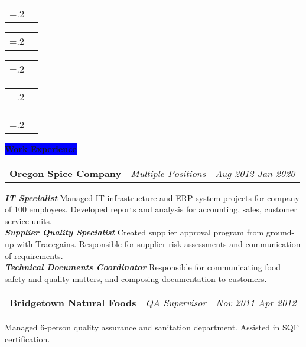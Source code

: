 \documentclass[letterpaper,12pt]{article}[leftmargin=*]
\newcommand{\experience}[2]{\vspace{6pt}
  \colorbox{Blue}{\color{white}#1\hspace{9pt}\raggedbottom\normalsize\textbf{#2\hspace{4pt}}}
}
\newcommand{\resumeSectionStart}{\begin{itemize}[leftmargin=0.1in]}
\newcommand{\resumeSectionEnd}{\end{itemize}}
\newcommand{\resumeSkill}[2]{
  \vspace{-3pt}
  \item[]
    \begin{tabularx}{0.97\textwidth}{>{\hsize=.2\hsize}X X }
      {\textbf{#1}} & {\small#2} \\
    \end{tabularx}
  \vspace{-3pt}
}
\newcommand{\resumeExperience}[3]{
  \vspace{-3pt}
  \item[]
    \begin{tabularx}{0.97\textwidth}{>{\raggedright}X >{\raggedright\arraybackslash}X >{\raggedleft\arraybackslash}X}
      \textbf{\color{primary}#1} & \textit{\color{accent}#2} & \textit{\color{accent}\small#3} \\
    \end{tabularx}
}
\newcommand{\tag}[1]{%
  \tikzmarknode[fill=white,fill
opacity=0,draw=subtle!60!subtle,thick,rounded corners,inner sep=0.4ex,text height=1.5ex,text depth=.25ex, text opacity=1]{test}{\hspace{1pt}\small{#1}\hspace{1pt}}
}
\begin{document}
\resumeSectionStart{

  \resumeSkill{Food Science}{
    \tag{Supplier Risk Assessment}
    \tag{Food Fraud Controls}
    \tag{Analytical Chemistry}
    \tag{Microbiology}
    \tag{Technical Documentation}
    \tag{HACCP/HARPC}
    \tag{BRC Certification}
    \tag{SQF Lvl 2 Certification}
  }

  \resumeSkill{Data Analysis}{
    \tag{ETL \& Data Cleaning}
    \tag{Natural Language Processing}
    \tag{Report Design}
    \tag{Database Design}
    \tag{Web Scraping}
    \tag{Technical Writing}
  }

  \resumeSkill{Python}{
    \tag{Pandas}
    \tag{NumPy}
    \tag{SciPy}
    \tag{SciKit-Learn}
    \tag{Conda}
    \tag{NLTK}
    \tag{spaCy}
    \tag{Matplotlib}
    \tag{Seaborn}
  }

  \resumeSkill{Languages}{
    \tag{SQL}
    \tag{Regex}
    \tag{HTML/CSS/Javascript}
    \tag{Visual Basic}
    \tag{C/C++}
    \tag{Latex}
  }

  \resumeSkill{Tools}{
    \tag{PostgreSQL}
    \tag{SQL Server}
    \tag{SQLite}
    \tag{Git \& GitHub}
    \tag{Excel}
    \tag{JIRA}
    \tag{Linux Admin}
    \tag{Database Admin}
    \tag{Windows Server Admin}
  }

}
\resumeSectionEnd{}

\experience{\faPieChart}{Work Experience}

\resumeSectionStart{
  \resumeExperience{Oregon Spice Company}{Multiple Positions}{Aug 2012 \textemdash{} Jan 2020}
  \textbf{\textit{\color{accent}IT Specialist}} \textemdash{} Managed IT infrastructure and ERP system projects for company of 100 employees. Developed reports and analysis for accounting, sales, customer service units. \\
  \textbf{\textit{\color{accent}Supplier Quality Specialist}} \textemdash{} Created supplier approval program from ground-up with Tracegains. Responsible for supplier risk assessments and communication of requirements. \\
  \textbf{\textit{\color{accent}Technical Documents Coordinator}} \textemdash{} Responsible for communicating food safety and quality matters, and composing documentation to customers.
}
\vspace{-6pt}
\resumeSectionEnd{}

\resumeSectionStart{
  \resumeExperience{Bridgetown Natural Foods}{QA Supervisor}{Nov 2011 \textemdash{} Apr 2012}
  Managed 6-person quality assurance and sanitation department. Assisted in SQF certification.
}
\vspace{-6pt}
\resumeSectionEnd{}
\end{document}

